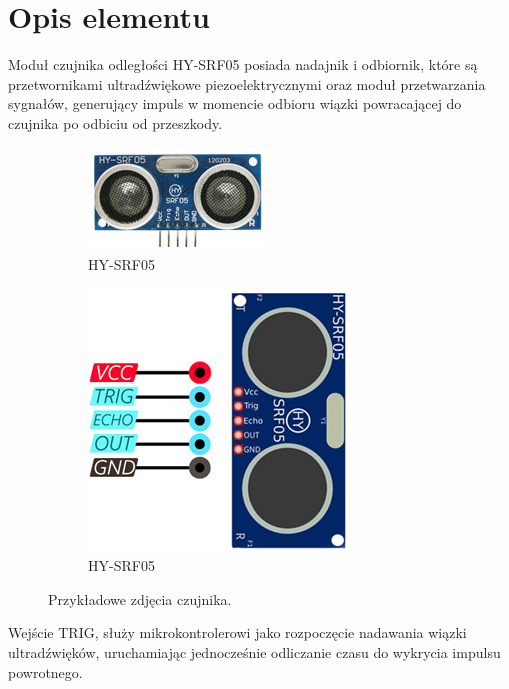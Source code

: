 \documentclass[11pt, a4paper]{article}
\author{Adam Rewekant}
\institute{Instytut Robotyki i Inteligencji Maszynowej}
\begin{document}

\newpage
\section*{Opis elementu} 
Moduł czujnika odległości HY-SRF05 posiada nadajnik i odbiornik, które są przetwornikami ultradźwiękowe piezoelektrycznymi oraz moduł przetwarzania sygnałów, generujący impuls w momencie odbioru wiązki powracającej do czujnika po odbiciu od przeszkody.



\vspace{0.5cm}
\begin{figure}[h]
\centering
\begin{subfigure}{.5\textwidth}
  \centering
  \includegraphics[width=.5\linewidth]{fig/element/fig2.png}
  \caption{HY-SRF05 \cite{fot2}}
  \label{fig:sub1}
\end{subfigure}%
\begin{subfigure}{.5\textwidth}
  \centering
  \includegraphics[width=.5\linewidth]{fig/element/fig1.png}
  \caption{HY-SRF05 \cite{fot2}}
  \label{fig:sub2}
\end{subfigure}
\caption{Przykładowe zdjęcia czujnika.}
\label{fig:test}
\end{figure}
\vspace{0.5cm}

Wejście TRIG, służy mikrokontrolerowi jako rozpoczęcie nadawania wiązki ultradźwięków, uruchamiając jednocześnie odliczanie czasu do wykrycia impulsu powrotnego.
\end{document}
